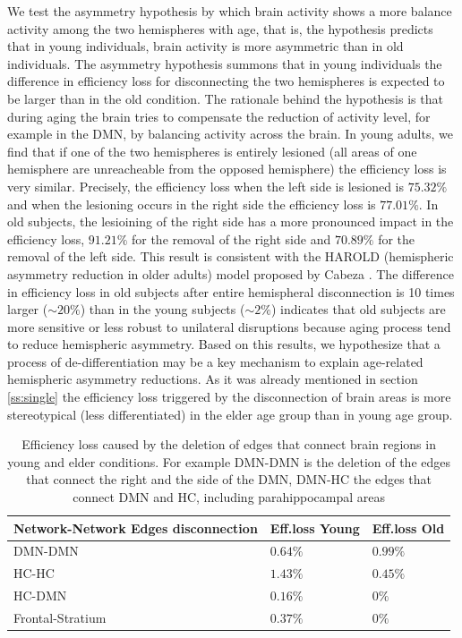 \documentclass[12pt,a4paper]{article}
\begin{document}
We test the asymmetry hypothesis by which brain activity shows a more balance activity among the two hemispheres with age, that is, the hypothesis predicts that in young individuals, brain activity is more asymmetric than in old individuals. The asymmetry hypothesis summons that in young individuals the difference in efficiency loss for disconnecting the two hemispheres is expected to be larger than in the old condition. The rationale behind the hypothesis is that during aging the brain tries to compensate the reduction of activity level, for example in the DMN, by balancing activity across the brain. 
In young adults, we find that if one of the two hemispheres is entirely lesioned (all areas of one hemisphere are unreacheable from the opposed hemisphere) the efficiency loss is very similar. Precisely, the efficiency loss  when the left side is lesioned is $75.32\%$ and when the lesioning occurs in the right side the efficiency loss is $77.01\%$. 
In old subjects, the lesioining of the right side has a more pronounced impact in the efficiency loss, $91.21\%$ for the removal of the right side and $70.89\%$ for the removal of the left side. 
This result is consistent with the HAROLD (hemispheric asymmetry reduction in older adults) model proposed by  
Cabeza \citep{cabeza_aging_2002}. The difference in efficiency loss in old subjects after entire hemispheral disconnection 
is 10 times larger ($\sim 20\%$) than in the young subjects ($\sim 2\%$) indicates that old subjects are more sensitive or less robust to unilateral disruptions because aging process tend to reduce hemispheric asymmetry.
Based on this results, we hypothesize that a process of de-differentiation may be a key mechanism to explain age-related hemispheric asymmetry reductions. As it was already mentioned in section \ref{ss:single}  the efficiency loss triggered by the disconnection of brain areas is more stereotypical (less differentiated) in the elder age group than in young age group.

\begin{table}[!htbp]
\centering%
\caption{Efficiency loss caused by the deletion of edges that connect brain regions in young and elder conditions. For example DMN-DMN is the deletion of the edges that connect the right and the side of the DMN, DMN-HC the edges that connect DMN and HC, including parahippocampal areas}
\begin{tabularx}{\linewidth}{XXX}
\toprule
Network-Network Edges disconnection & Eff.loss Young & Eff.loss Old\\
\midrule
\midrule
DMN-DMN & $0.64\%$& $0.99\%$\\
\midrule
HC-HC & $1.43\%$& $0.45\%$\\
\midrule
HC-DMN & $0.16\%$& $0\%$\\
\midrule
Frontal-Stratium & $0.37\%$& $0\%$\\
\bottomrule
\end{tabularx}
\label{tab:edges}
\end{table}
\end{document}
